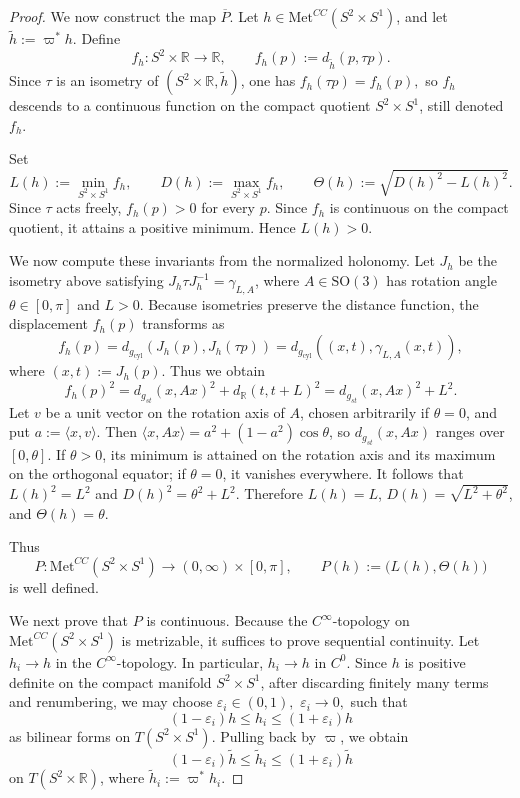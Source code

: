 \documentclass[10pt,a4paper]{amsart}
\begin{document}
\begin{proof}
We now construct the map \(\overline P\).
Let \(h\in \mathrm{Met}^{CC}(S^2\times S^1)\), and let
$\widetilde h:=\varpi^*h$.
Define
\[
f_h\colon S^2\times \mathbb R\longrightarrow \mathbb R,
\qquad
f_h(p):=d_{\widetilde h}(p,\tau p).
\]
Since \(\tau\) is an isometry of \((S^2\times \mathbb R,\widetilde h)\), one has
$f_h(\tau p)=f_h(p),$
so \(f_h\) descends to a continuous function on the compact quotient \(S^2\times S^1\), still denoted \(f_h\).

Set
\[
L(h):=\min_{S^2\times S^1} f_h,
\qquad
D(h):=\max_{S^2\times S^1} f_h,
\qquad
\Theta(h):=\sqrt{D(h)^2-L(h)^2}.
\]
Since $\tau$ acts freely, $f_h(p)>0$ for every $p$. Since $f_h$ is continuous
on the compact quotient, it attains a positive minimum. Hence $L(h)>0$.

We now compute these invariants from the normalized holonomy. Let $J_h$ be the
isometry above satisfying $J_h\tau J_h^{-1}=\gamma_{L,A}$, where
$A\in\mathrm{SO}(3)$ has rotation angle $\theta\in[0,\pi]$ and $L>0$.
Because isometries preserve the distance function, the displacement $f_h(p)$
transforms as
\[
f_h(p)
=d_{g_{\mathrm{cyl}}}(J_h(p),J_h(\tau p))
=d_{g_{\mathrm{cyl}}}((x,t),\gamma_{L,A}(x,t)),
\]
where $(x,t):=J_h(p)$. Thus we obtain
\[
f_h(p)^2 = d_{g_{st}}(x, Ax)^2 + d_{\mathbb{R}}(t, t+L)^2 = d_{g_{st}}(x, Ax)^2 + L^2.
\]
Let $v$ be a unit vector on the rotation axis of $A$, chosen arbitrarily if
$\theta=0$, and put $a:=\langle x,v\rangle$. Then
\(\langle x,Ax\rangle=a^2+(1-a^2)\cos\theta\),
so $d_{g_{st}}(x,Ax)$ ranges over $[0,\theta]$. If $\theta>0$, its minimum
is attained on the rotation axis and its maximum on the orthogonal equator;
if $\theta=0$, it vanishes everywhere. It follows that
\(L(h)^2 = L^2\) and \(D(h)^2 = \theta^2 + L^2\).
Therefore
\(L(h)=L\), \(D(h)=\sqrt{L^2+\theta^2}\), and \(\Theta(h)=\theta\).

Thus
\[
P\colon\mathrm{Met}^{CC}(S^2\times S^1)\longrightarrow (0,\infty)\times[0,\pi],
\qquad
P(h):=\bigl(L(h),\Theta(h)\bigr)
\]
is well defined.

We next prove that \(P\) is continuous. Because the $C^\infty$-topology on
$\mathrm{Met}^{CC}(S^2\times S^1)$ is metrizable, it suffices to prove
sequential continuity. Let \(h_i\to h\) in the \(C^\infty\)-topology. In
particular, \(h_i\to h\) in \(C^0\). Since \(h\) is positive definite on the compact manifold \(S^2\times S^1\), after discarding finitely many terms and renumbering, we may choose
$\varepsilon_i\in(0,1),$ $\varepsilon_i\to 0,$ such that
\[
(1-\varepsilon_i)h\le h_i\le (1+\varepsilon_i)h
\]
as bilinear forms on \(T(S^2\times S^1)\). Pulling back by \(\varpi\), we obtain
\[
(1-\varepsilon_i)\widetilde h\le \widetilde h_i\le (1+\varepsilon_i)\widetilde h
\]
on \(T(S^2\times \mathbb R)\), where \(\widetilde h_i:=\varpi^*h_i\).


\end{proof}
\end{document}
